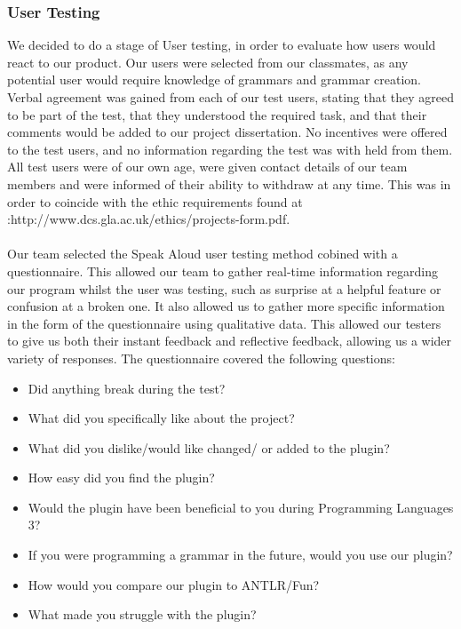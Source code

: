 \subsubsection{User Testing}
We decided to do a stage of User testing, in order to evaluate how users would react to our product. Our users were selected from our classmates, as any potential user would require knowledge of grammars and grammar creation. Verbal agreement was gained from each of our test users, stating that they agreed to be part of the test, that they understood the required task, and that their comments would be added to our project dissertation. No incentives were offered to the test users, and no information regarding the test was with held from them.  All test users were of our own age, were given contact details of our team members and were informed of their ability to withdraw at any time. This was in order to coincide with the ethic requirements found at :http://www.dcs.gla.ac.uk/ethics/projects-form.pdf.\\
\\
Our team selected the Speak Aloud user testing method cobined with a questionnaire. This allowed our team to gather real-time information regarding our program whilst the user was testing, such as surprise at a helpful feature or confusion at a broken one. It also allowed us to gather more specific information in the form of the questionnaire using qualitative data. This allowed our testers to give us both their instant feedback and reflective feedback, allowing us a wider variety of responses. The questionnaire covered the following questions:
\begin {itemize}
    \item Did anything break during the test?
    \item What did you specifically like about the project?
    \item What did you dislike/would like changed/ or added to the plugin?
    \item How easy did you find the plugin?
    \item Would the plugin have been beneficial to you during Programming Languages 3?
    \item If you were programming a grammar in the future, would you use our plugin?
    \item How would you compare our plugin to ANTLR/Fun?
    \item What made you struggle with the plugin?
\end{itemize}

